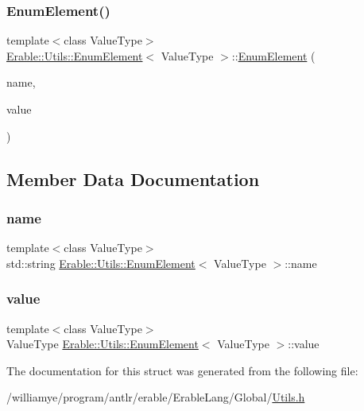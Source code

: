 \subsubsection{\texorpdfstring{EnumElement()}{EnumElement()}}
{\footnotesize\ttfamily template$<$class Value\+Type$>$ \\
\mbox{\hyperlink{struct_erable_1_1_utils_1_1_enum_element}{Erable\+::\+Utils\+::\+Enum\+Element}}$<$ Value\+Type $>$\+::\mbox{\hyperlink{struct_erable_1_1_utils_1_1_enum_element}{Enum\+Element}} (\begin{DoxyParamCaption}\item[{std\+::string}]{name,  }\item[{Value\+Type}]{value }\end{DoxyParamCaption})\hspace{0.3cm}{\ttfamily [inline]}}



\subsection{Member Data Documentation}
\mbox{\label{struct_erable_1_1_utils_1_1_enum_element_a1b5ca282ac97cac35ba1919d03168b80}} 
\subsubsection{\texorpdfstring{name}{name}}
{\footnotesize\ttfamily template$<$class Value\+Type$>$ \\
std\+::string \mbox{\hyperlink{struct_erable_1_1_utils_1_1_enum_element}{Erable\+::\+Utils\+::\+Enum\+Element}}$<$ Value\+Type $>$\+::name}

\mbox{\label{struct_erable_1_1_utils_1_1_enum_element_a8f6e0533bacee39dfe1a1231139a857c}} 
\subsubsection{\texorpdfstring{value}{value}}
{\footnotesize\ttfamily template$<$class Value\+Type$>$ \\
Value\+Type \mbox{\hyperlink{struct_erable_1_1_utils_1_1_enum_element}{Erable\+::\+Utils\+::\+Enum\+Element}}$<$ Value\+Type $>$\+::value}



The documentation for this struct was generated from the following file\+:\begin{DoxyCompactItemize}
\item 
/williamye/program/antlr/erable/\+Erable\+Lang/\+Global/\mbox{\hyperlink{_utils_8h}{Utils.\+h}}\end{DoxyCompactItemize}
